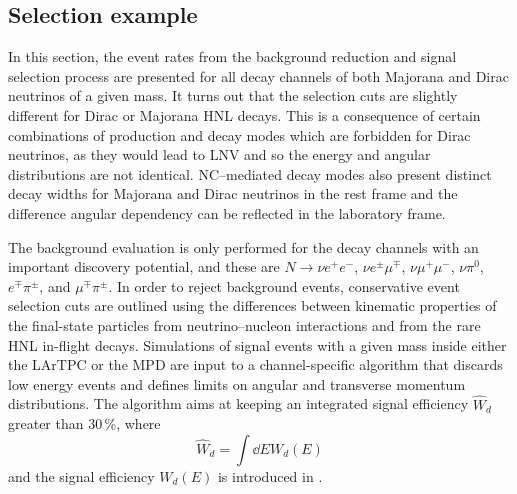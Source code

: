 \subsection{Selection example}
\label{sec:selection}

In this section, the event rates from the background reduction and signal selection process are presented %
for all decay channels of both Majorana and Dirac neutrinos of a given mass.
It turns out that the selection cuts are slightly different for Dirac or Majorana HNL decays.
This is a consequence of certain combinations of production and decay modes which are forbidden for Dirac neutrinos, %
as they would lead to LNV and so the energy and angular distributions are not identical.
NC--mediated decay modes also present distinct decay widths for Majorana and Dirac neutrinos in the rest frame %
and the difference angular dependency can be reflected in the laboratory frame.

The background evaluation is only performed for the decay channels with an important discovery potential, %
and these are $N \to \nu e^+ e^-$, $\nu e^\pm \mu^\mp$, $\nu \mu^+\mu^-$, $\nu\pi^0$, $e^\mp\pi^\pm$, and $\mu^\mp\pi^\pm$.
In order to reject background events, conservative event selection cuts are outlined using the differences %
between kinematic properties of the final-state particles from neutrino--nucleon interactions and %
from the rare HNL in-flight decays.
Simulations of signal events with a given mass inside either the LArTPC or the MPD are input to a %
channel-specific algorithm that discards low energy events and %
defines limits on angular and transverse momentum distributions.
The algorithm aims at keeping an integrated signal efficiency $\widehat{W}_d$ greater than 30\,\%, where 
\begin{equation}
	\label{eq:integrated_eff}
	\widehat{W}_d = \int \dd{E} W_d(E)
\end{equation}
and the signal efficiency $W_d(E)$ is introduced in .

